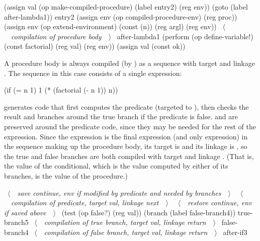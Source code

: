 \begin{codeBlock}
  (assign val
          (op make-compiled-procedure)
          (label entry2)
          (reg env))
  (goto (label after-lambda1))
entry2
  (assign env (op compiled-procedure-env) (reg proc))
  (assign env
          (op extend-environment)
          (const (n))
          (reg argl)
          (reg env))
  ~\(\langle \)~~\emph{compilation of procedure body}~~\(\rangle \)~
after-lambda1
  (perform (op define-variable!)
           (const factorial)
           (reg val)
           (reg env))
  (assign val (const ok))
\end{codeBlock}

\noindent
A procedure body is always compiled (by ) as a
sequence with target  and linkage .  The sequence in
this case consists of a single  expression:

\begin{codeBlock}
(if (= n 1)
    1
    (* (factorial (- n 1)) n))
\end{codeBlock}

\noindent
{} generates code that first computes the predicate (targeted to
), then checks the result and branches around the true branch if the
predicate is false.   and  are preserved around the
predicate code, since they may be needed for the rest of the 
expression.  Since the  expression is the final expression (and only
expression) in the sequence making up the procedure body, its target is
 and its linkage is , so the true and false branches are
both compiled with target  and linkage .  (That is, the
value of the conditional, which is the value computed by either of its
branches, is the value of the procedure.)

\begin{codeBlock}
~\(\langle \)~~\emph{save \emph{continue}, \emph{env} if modified by predicate and needed by branches}~~\(\rangle \)~
  ~\(\langle \)~~\emph{compilation of predicate, target \emph{val}, linkage \emph{next}}~~\(\rangle \)~
  ~\(\langle \)~~\emph{restore \emph{continue}, \emph{env} if saved above}~~\(\rangle \)~
  (test (op false?) (reg val))
  (branch (label false-branch4))
true-branch5
  ~\(\langle \)~~\emph{compilation of true branch, target \emph{val}, linkage \emph{return}}~~\(\rangle \)~
false-branch4
  ~\(\langle \)~~\emph{compilation of false branch, target \emph{val}, linkage \emph{return}}~~\(\rangle \)~
after-if3
\end{codeBlock}

